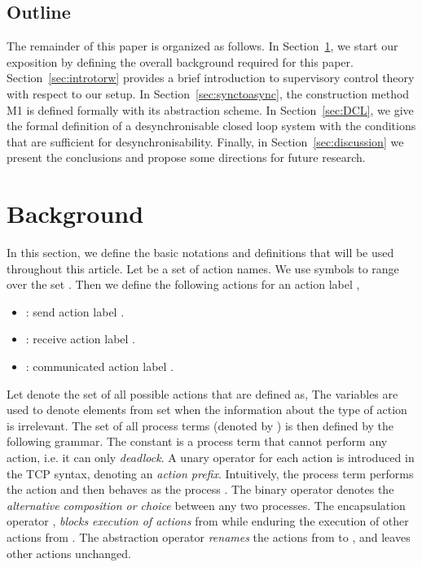 \documentclass[copyright]{eptcs}
\theoremstyle{plain}
\theoremstyle{definition}
\begin{document}
\subsection{Outline}
The remainder of this paper is organized as follows. In Section~\ref{sec:background}, we start our exposition by defining the overall background required for this paper. Section~\ref{sec:introtorw} provides a brief introduction to supervisory control theory with respect to our setup. In Section~\ref{sec:synctoasync}, the construction method M1 is defined formally with its abstraction scheme. In Section~\ref{sec:DCL}, we give the formal definition of a desynchronisable closed loop system with the conditions that are sufficient for desynchronisability. Finally, in Section~\ref{sec:discussion} we present the conclusions and propose some directions for future research.

\section{Background}\label{sec:background}

In this section, we define the basic notations and definitions that will be used throughout this article. Let  be a set of action names. We use symbols  to range over the set . Then we define the following actions for an action label ,
\begin{itemize}
\item : send action label .
\item : receive action label .
\item : communicated action label .
\end{itemize}
Let  denote the set of all possible actions that are defined as,  The variables  are used to denote elements from set  when the information about the type of action is irrelevant. The set of all process terms (denoted by ) is then defined by the following grammar. The constant  is a process term that cannot perform any action, i.e. it can only \emph{deadlock}. A unary operator  for each action  is introduced in the TCP syntax, denoting an \emph{action prefix}. Intuitively, the process term  performs the action  and then behaves as the process . The binary operator  denotes the \emph{alternative composition or choice} between any two processes. The encapsulation operator , \emph{blocks execution of actions} from  while enduring the execution of other actions from . The abstraction operator  \emph{renames} the actions from  to , and leaves other actions unchanged.
\end{document}

